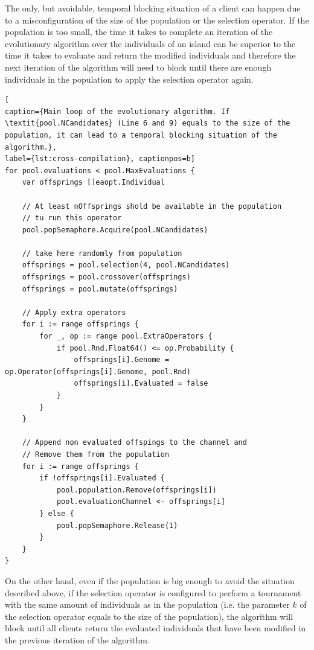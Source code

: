 The only, but avoidable, temporal blocking situation of a client can happen due to a misconfiguration of the size of the population or the selection operator. If the population is too small, the time it takes to complete an iteration of the evolutionary algorithm over the individuals of an island can be superior to the time it takes to evaluate and return the modified individuals and therefore the next iteration of the algorithm will need to block until there are enough individuals in the population to apply the selection operator again. 

\begin{lstlisting}[
caption={Main loop of the evolutionary algorithm. If \textit{pool.NCandidates} (Line 6 and 9) equals to the size of the population, it can lead to a temporal blocking situation of the algorithm.},
label={lst:cross-compilation}, captionpos=b]
for pool.evaluations < pool.MaxEvaluations {
    var offsprings []eaopt.Individual

    // At least nOffsprings shold be available in the population
    // tu run this operator
    pool.popSemaphore.Acquire(pool.NCandidates)

    // take here randomly from population
    offsprings = pool.selection(4, pool.NCandidates)
    offsprings = pool.crossover(offsprings)
    offsprings = pool.mutate(offsprings)

    // Apply extra operators
    for i := range offsprings {
        for _, op := range pool.ExtraOperators {
            if pool.Rnd.Float64() <= op.Probability {
                offsprings[i].Genome = op.Operator(offsprings[i].Genome, pool.Rnd)
                offsprings[i].Evaluated = false
            }
        }
    }

    // Append non evaluated offspings to the channel and
    // Remove them from the population
    for i := range offsprings {
        if !offsprings[i].Evaluated {
            pool.population.Remove(offsprings[i])
            pool.evaluationChannel <- offsprings[i]
        } else {
            pool.popSemaphore.Release(1)
        }
    }
}
\end{lstlisting} 

On the other hand, even if the population is big enough to avoid the situation described above, if the selection operator is configured to perform a tournament with the same amount of individuals as in the population (i.e. the parameter $k$ of the selection operator equals to the size of the population), the algorithm will block until all clients return the evaluated individuals that have been modified in the previous iteration of the algorithm.

